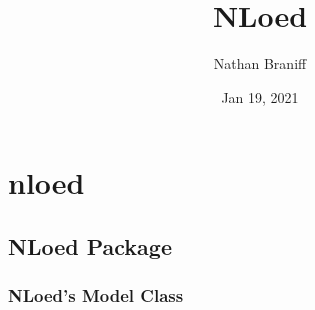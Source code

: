 \documentclass[letterpaper,10pt,english,openany,oneside]{sphinxmanual}
\title{NLoed}
\date{Jan 19, 2021}
\author{Nathan Braniff}
\begin{document}
\pagestyle{empty}
\sphinxmaketitle
\pagestyle{plain}
\sphinxtableofcontents
\pagestyle{normal}
\label{\detokenize{index::doc}}



\chapter{nloed}
\label{\detokenize{modules:nloed}}\label{\detokenize{modules::doc}}

\section{NLoed Package}
\label{\detokenize{nloed:nloed-package}}\label{\detokenize{nloed::doc}}

\subsection{NLoed’s Model Class}
\label{\detokenize{nloed:module-nloed.model}}\label{\detokenize{nloed:nloed-s-model-class}}
\end{document}
